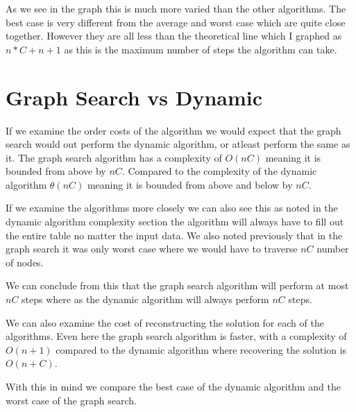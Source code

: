 \documentclass{article}
\begin{document}
			As we see in the graph this is much more varied than the other algorithms. The best case is very different from the average and worst case which are quite close together. However they are all less than the theoretical line which I graphed as $n*C + n + 1$ as this is the maximum number of steps the algorithm can take.		
			
			
	\section{Graph Search vs Dynamic}
		If we examine the order costs of the algorithm we would expect that the graph search would out perform the dynamic algorithm, or atleast perform the same as it. The graph search algorithm has a complexity of $O(nC)$ meaning it is bounded from above by $nC$. Compared to the complexity of the dynamic algorithm $\theta(nC)$ meaning it is bounded from above and below by $nC$.\newline

		If we examine the algorithms more closely we can also see this as noted in the dynamic algorithm complexity section the algorithm will always have to fill out the entire table no matter the input data. We also noted previously that in the graph search it was only worst case where we would have to traverse $nC$ number of nodes. \newline		
		
		We can conclude from this that the graph search algorithm will perform at most $nC$ steps where as the dynamic algorithm will always perform $nC$ steps.\newline
		
		We can also examine the cost of reconstructing the solution for each of the algorithms. Even here the graph search algorithm is faster, with a complexity of $O(n + 1)$ compared to the dynamic algorithm where recovering the solution is $O(n + C)$. \newline
		
		With this in mind we compare the best case of the dynamic algorithm and the worst case of the graph search.
		
\end{document}
